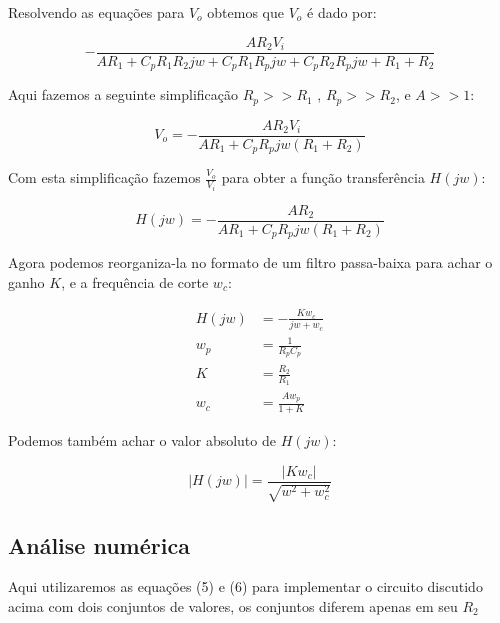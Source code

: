 Resolvendo as equações para $V_o$ obtemos que $V_o$ é dado por:


\begin{equation}
    - \frac{A R_{2} V_{i}}{A R_{1} + C_{p} R_{1} R_{2} j w + C_{p} R_{1} R_{p} j w + C_{p} R_{2} R_{p} j w
        + R_{1} + R_{2}}
\end{equation}


Aqui fazemos a seguinte simplificação $R_p >> R_1$ , $R_p >> R_2$, e $A >> 1$:


\begin{equation}
    V_o = - \frac{A R_{2} V_{i}}{A R_{1} + C_{p} R_{p} j w \left(R_{1} + R_{2}\right)}
\end{equation}


Com esta simplificação fazemos $\frac{V_o}{V_i}$ para obter a função transferência $H\left(jw\right)$:


\begin{equation}
    H\left(jw\right) = - \frac{A R_{2}}{A R_{1} + C_{p} R_{p} j w \left(R_{1} + R_{2}\right)}
\end{equation}


Agora podemos reorganiza-la no formato de um filtro passa-baixa para achar o ganho $K$, e a frequência de corte $w_c$:


\begin{equation}
    \begin{aligned}
        H(jw) & = - \frac{K w_c}{jw + w_c} \\
        w_p   & = \frac{1}{R_p C_p}        \\
        K     & = \frac{R_2}{R_1}          \\
        w_c   & = \frac{A w_p}{1 + K}
    \end{aligned}
\end{equation}


Podemos também achar o valor absoluto de $H(jw)$:


\begin{equation}
    \lvert H(jw) \rvert = \frac{\left|{K w_{c}}\right|}{\sqrt{w^{2} + w_{c}^{2}}}
\end{equation}


\subsection{Análise numérica}


Aqui utilizaremos as equações (5) e (6) para implementar o circuito discutido acima com dois conjuntos de valores, os conjuntos diferem apenas em seu $R_2$


